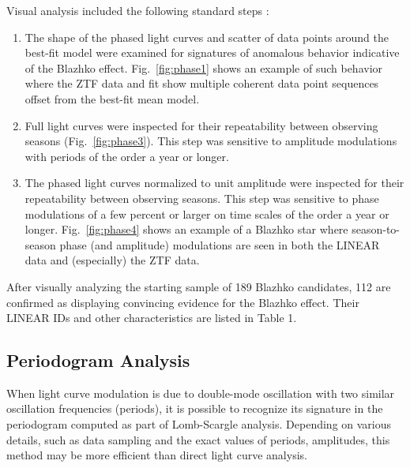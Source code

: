 Visual analysis included the following standard steps \citep[e.g.,][]{2009MNRAS.400.1006J}: 
\begin{enumerate}
\item The shape of the phased light curves and scatter of data points around the best-fit model were examined
    for signatures of anomalous behavior indicative of the Blazhko effect. 
    Fig.~\ref{fig:phase1} shows an example of such behavior where the ZTF data and fit show multiple coherent data point sequences
    offset from the best-fit mean model. 
  \item Full light curves were inspected for their repeatability between observing seasons (Fig.~\ref{fig:phase3}).
       This step was sensitive to amplitude modulations with periods of the order a year or longer.  
     \item The phased light curves normalized to unit amplitude were inspected for their repeatability between observing seasons.
       This step was sensitive to phase modulations of a few percent or larger on time scales of the order a year or longer.  
       Fig.~\ref{fig:phase4} shows an example of a Blazhko star where season-to-season phase (and amplitude) modulations
       are seen in both the LINEAR data and (especially) the ZTF data. 
\end{enumerate}

After visually analyzing the starting sample of 189 Blazhko candidates, 112 are confirmed as displaying
convincing evidence for the Blazhko effect. Their LINEAR IDs and other characteristics are listed in Table 1. 


\subsection{Periodogram Analysis} 



When light curve modulation is due to double-mode oscillation with two similar oscillation frequencies (periods),
it is possible to recognize its signature in the periodogram computed as part of Lomb-Scargle analysis. Depending
on various details, such as data sampling and the exact values of periods, amplitudes, this method may be
more efficient than direct light curve analysis.

